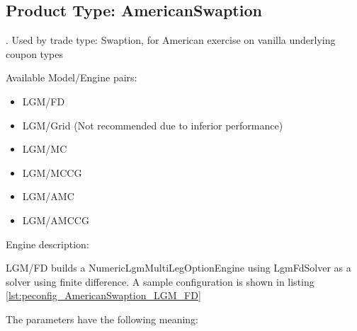 \subsection{Product Type: AmericanSwaption}

\label{sec:AmericanSwaption_pt}.
Used by trade type: Swaption, for American exercise on vanilla underlying coupon types

Available Model/Engine pairs:

\begin{itemize}
\item LGM/FD
\item LGM/Grid (Not recommended due to inferior performance)
\item LGM/MC
\item LGM/MCCG
\item LGM/AMC
\item LGM/AMCCG
\end{itemize}

Engine description:

LGM/FD builds a NumericLgmMultiLegOptionEngine using LgmFdSolver as a solver using finite difference. A sample
configuration is shown in listing \ref{lst:peconfig_AmericanSwaption_LGM_FD}

The parameters have the following meaning:

